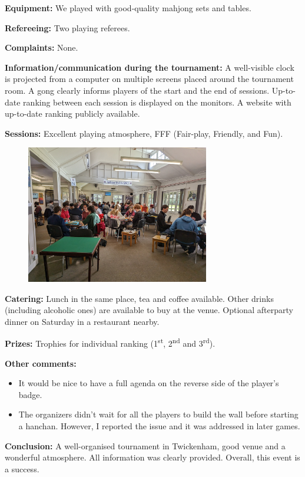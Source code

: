 \documentclass{article}
\newcommand{\repsec}[1]{\textbf{#1:}}
\begin{document}
\repsec{Equipment}
We played with good-quality mahjong sets and tables.

\repsec{Refereeing}
Two playing referees.

\repsec{Complaints}
None.

\repsec{Information/communication during the tournament}
A well-visible clock is projected from a computer on multiple screens placed around the tournament room.
A gong clearly informs players of the start and the end of sessions.
Up-to-date ranking between each session is displayed on the monitors.
A website with up-to-date ranking publicly available.

\repsec{Sessions}
Excellent playing atmosphere, FFF (Fair-play, Friendly, and Fun).

\begin{figure}[ht]
\centering
\includegraphics[width=8cm]{tournament3}
\end{figure}

\repsec{Catering}
Lunch in the same place, tea and coffee available.
Other drinks (including alcoholic ones) are available to buy at the venue.
Optional afterparty dinner on Saturday in a restaurant nearby.

\repsec{Prizes}
Trophies for individual ranking (1\textsuperscript{st}, 2\textsuperscript{nd} and 3\textsuperscript{rd}).

\repsec{Other comments}
\begin{itemize}
    \item It would be nice to have a full agenda on the reverse side of the player's badge.
    \item The organizers didn't wait for all the players to build the wall before starting a hanchan.
        However, I reported the issue and it was addressed in later games.
\end{itemize}

\repsec{Conclusion}
A well-organised tournament in Twickenham, good venue and a wonderful atmosphere.
All information was clearly provided.
Overall, this event is a success.
\end{document}
